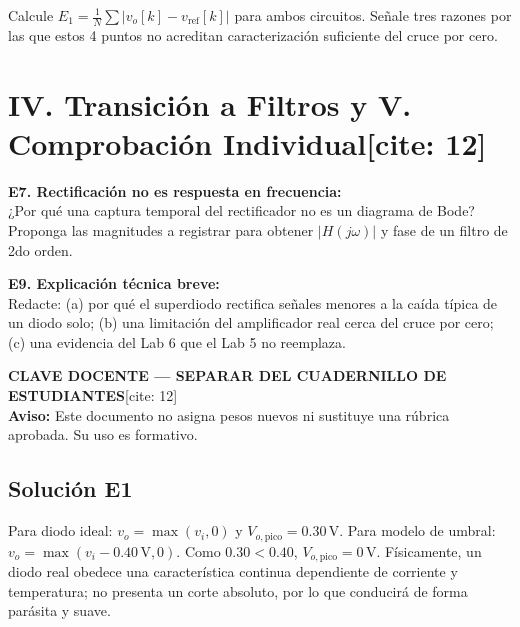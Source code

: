 \documentclass[10pt, a4paper]{article}
\renewcommand{\headrulewidth}{0.4pt}
\begin{document}
Calcule $E_1 = \frac{1}{N} \sum |v_o[k] - v_{\mathrm{ref}}[k]|$ para ambos circuitos. Señale tres razones por las que estos 4 puntos no acreditan caracterización suficiente del cruce por cero.

\vspace{2.0cm}

\section*{IV. Transición a Filtros y V. Comprobación Individual[cite: 12]}
\textbf{E7. Rectificación no es respuesta en frecuencia:}\\
¿Por qué una captura temporal del rectificador no es un diagrama de Bode? Proponga las magnitudes a registrar para obtener $|H(j\omega)|$ y fase de un filtro de 2do orden.

\vspace{1.5cm}

\noindent\textbf{E9. Explicación técnica breve:}\\
Redacte: (a) por qué el superdiodo rectifica señales menores a la caída típica de un diodo solo; (b) una limitación del amplificador real cerca del cruce por cero; (c) una evidencia del Lab 6 que el Lab 5 no reemplaza.

\newpage
\renewcommand{\headrulewidth}{0.8pt}

\begin{center}
    {\Large\textbf{\textcolor{red!70!black}{CLAVE DOCENTE — SEPARAR DEL CUADERNILLO DE ESTUDIANTES}}}[cite: 12] \\[0.1cm]
    {\footnotesize\textbf{Aviso:} Este documento no asigna pesos nuevos ni sustituye una rúbrica aprobada. Su uso es formativo.}
\end{center}

\subsection*{Solución E1}
Para diodo ideal: $v_o = \max(v_i, 0)$ y $V_{o,\mathrm{pico}} = 0.30\,\text{V}$. Para modelo de umbral: $v_o = \max(v_i - 0.40\,\text{V}, 0)$. Como $0.30 < 0.40$, $V_{o,\mathrm{pico}} = 0\,\text{V}$. Físicamente, un diodo real obedece una característica continua dependiente de corriente y temperatura; no presenta un corte absoluto, por lo que conducirá de forma parásita y suave.
\end{document}
